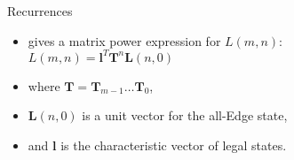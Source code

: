 \documentclass{prosper}
\newtheorem{theorem}{\sc Theorem}
\newcommand{\BFL}{\mathbf{L}}
\newcommand{\BFl}{\mathbf{l}}
\newcommand{\BFv}{\mathbf{v}}
\newcommand{\BFT}{\mathbf{T}}
\begin{document}

\begin{slide}{Recurrences}
\begin{itemize}
\item gives a matrix power expression for $L(m,n)$: \\
  $L(m,n) = \BFl^T \BFT^n \BFL(n,0)$
\item where $\BFT=\BFT_{m-1} \dots \BFT_{0}$,
\item $\BFL(n,0)$ is a unit vector for the all-Edge state,
\item and $\BFl$ is the characteristic vector of legal states.
\end{itemize}
\end{slide}




\end{document}
